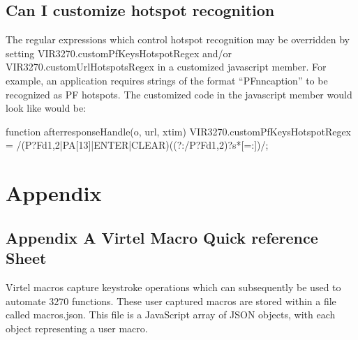 \documentclass[letterpaper,10pt,english]{sphinxmanual}
\begin{document}
\ignorespaces 

\section{Can I customize hotspot recognition}
\label{\detokenize{Customization:can-i-customize-hotspot-recognition}}\label{\detokenize{Customization:index-130}}
\sphinxAtStartPar
The regular expressions which control hotspot recognition may be overridden by setting VIR3270.customPfKeysHotspotRegex and/or VIR3270.customUrlHotspotsRegex in a customized javascript member. For example, an application requires strings of the format “PFnn\sphinxhyphen{}caption” to be recognized as PF hotspots. The customized code in the javascript member would look like would be:

\begin{sphinxVerbatim}[commandchars=\\\{\}]
function after\PYGZus{}responseHandle(o, url, xtim) \PYGZob{}
VIR3270.customPfKeysHotspotRegex = /(P?F\PYGZbs{}d\PYGZob{}1,2\PYGZcb{}|PA[1\PYGZhy{}3]|ENTER|CLEAR)((?:\PYGZbs{}/P?F\PYGZbs{}d\PYGZob{}1,2\PYGZcb{})?\PYGZbs{}s*[=:\PYGZhy{}])/;
\PYGZcb{}
\end{sphinxVerbatim}


\chapter{Appendix}
\label{\detokenize{Customization:appendix}}

\section{Appendix A \sphinxhyphen{} Virtel Macro Quick reference Sheet}
\label{\detokenize{Customization:appendix-a-virtel-macro-quick-reference-sheet}}
\sphinxAtStartPar
Virtel macros capture keystroke operations which can subsequently be used to automate 3270 functions.
These user captured macros are stored within a file called macros.json. This file is a JavaScript array of JSON objects, with each object representing a user
macro.
\end{document}
